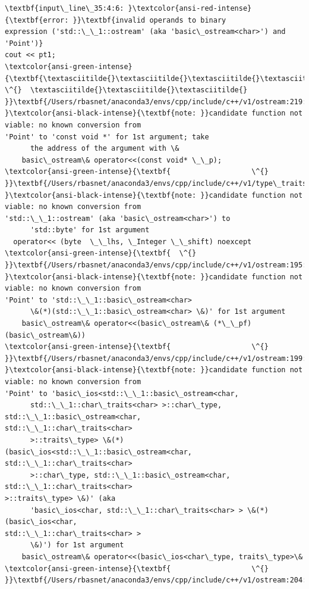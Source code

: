 \documentclass[11pt]{article}
\begin{document}
    \begin{Verbatim}[commandchars=\\\{\}]
\textbf{input\_line\_35:4:6: }\textcolor{ansi-red-intense}{\textbf{error: }}\textbf{invalid operands to binary
expression ('std::\_\_1::ostream' (aka 'basic\_ostream<char>') and 'Point')}
cout << pt1;
\textcolor{ansi-green-intense}{\textbf{\textasciitilde{}\textasciitilde{}\textasciitilde{}\textasciitilde{} \^{}  \textasciitilde{}\textasciitilde{}\textasciitilde{}
}}\textbf{/Users/rbasnet/anaconda3/envs/cpp/include/c++/v1/ostream:219:20:
}\textcolor{ansi-black-intense}{\textbf{note: }}candidate function not viable: no known conversion from
'Point' to 'const void *' for 1st argument; take
      the address of the argument with \&
    basic\_ostream\& operator<<(const void* \_\_p);
\textcolor{ansi-green-intense}{\textbf{                   \^{}
}}\textbf{/Users/rbasnet/anaconda3/envs/cpp/include/c++/v1/type\_traits:4034:3:
}\textcolor{ansi-black-intense}{\textbf{note: }}candidate function not viable: no known conversion from
'std::\_\_1::ostream' (aka 'basic\_ostream<char>') to
      'std::byte' for 1st argument
  operator<< (byte  \_\_lhs, \_Integer \_\_shift) noexcept
\textcolor{ansi-green-intense}{\textbf{  \^{}
}}\textbf{/Users/rbasnet/anaconda3/envs/cpp/include/c++/v1/ostream:195:20:
}\textcolor{ansi-black-intense}{\textbf{note: }}candidate function not viable: no known conversion from
'Point' to 'std::\_\_1::basic\_ostream<char>
      \&(*)(std::\_\_1::basic\_ostream<char> \&)' for 1st argument
    basic\_ostream\& operator<<(basic\_ostream\& (*\_\_pf)(basic\_ostream\&))
\textcolor{ansi-green-intense}{\textbf{                   \^{}
}}\textbf{/Users/rbasnet/anaconda3/envs/cpp/include/c++/v1/ostream:199:20:
}\textcolor{ansi-black-intense}{\textbf{note: }}candidate function not viable: no known conversion from
'Point' to 'basic\_ios<std::\_\_1::basic\_ostream<char,
      std::\_\_1::char\_traits<char> >::char\_type, std::\_\_1::basic\_ostream<char,
std::\_\_1::char\_traits<char>
      >::traits\_type> \&(*)(basic\_ios<std::\_\_1::basic\_ostream<char,
std::\_\_1::char\_traits<char>
      >::char\_type, std::\_\_1::basic\_ostream<char, std::\_\_1::char\_traits<char>
>::traits\_type> \&)' (aka
      'basic\_ios<char, std::\_\_1::char\_traits<char> > \&(*)(basic\_ios<char,
std::\_\_1::char\_traits<char> >
      \&)') for 1st argument
    basic\_ostream\& operator<<(basic\_ios<char\_type, traits\_type>\&
\textcolor{ansi-green-intense}{\textbf{                   \^{}
}}\textbf{/Users/rbasnet/anaconda3/envs/cpp/include/c++/v1/ostream:204:20:

\end{Verbatim}
\end{document}
